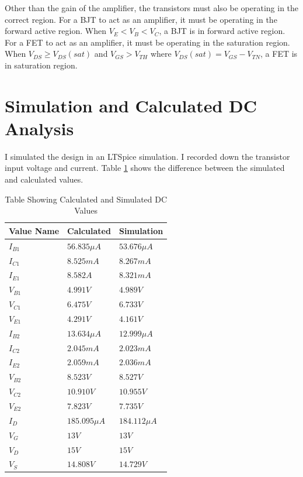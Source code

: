 \documentclass{article}
\begin{document}
Other than the gain of the amplifier, the transistors must also be operating in the correct region.
For a BJT to act as an amplifier, it must be operating in the forward active region.
When $V_{E} < V_{B} < V_{C}$, a BJT is in forward active region.
For a FET to act as an amplifier, it must be operating in the saturation region.
When $V_{DS} \ge V_{DS}(sat)$ and $V_{GS} > V_{TH}$ where $V_{DS}(sat) = V_{GS} - V_{TN}$, a FET is in saturation region.



\section{Simulation and Calculated DC Analysis}
\label{sec:dc-analysis}

I simulated the design in an LTSpice simulation.
I recorded down the transistor input voltage and current.
Table \ref{tab:sim-cal-dc-values} shows the difference between the simulated and calculated values.

\begin{table}[h]
    \caption{Table Showing Calculated and Simulated DC Values}
    \label{tab:sim-cal-dc-values}
    \centering
    \begin{tabular}{ l l l}
        \hline
        Value Name & Calculated       & Simulation       \\
        \hline
        $I_{B1}$   & $56.835 \mu{A}$  & $53.676 \mu{A}$  \\
        $I_{C1}$   & $8.525 mA$       & $8.267 mA$       \\
        $I_{E1}$   & $8.582 A$        & $8.321 mA$       \\
        $V_{B1}$   & $4.991 V$        & $4.989 V$        \\
        $V_{C1}$   & $6.475 V$        & $6.733 V$        \\
        $V_{E1}$   & $4.291 V$        & $4.161 V$        \\
        \hline
        $I_{B2}$   & $13.634 \mu{A}$  & $12.999 \mu{A}$  \\
        $I_{C2}$   & $2.045 mA$       & $2.023 mA$       \\
        $I_{E2}$   & $2.059 mA$       & $2.036 mA$       \\
        $V_{B2}$   & $8.523 V$        & $8.527 V$        \\
        $V_{C2}$   & $10.910 V$       & $10.955 V$       \\
        $V_{E2}$   & $7.823 V$        & $7.735 V$        \\
        \hline
        $I_{D}$    & $185.095 \mu{A}$ & $184.112 \mu{A}$ \\
        $V_{G}$    & $13 V$           & $13 V$           \\
        $V_{D}$    & $15 V$           & $15 V$           \\
        $V_{S}$    & $14.808 V$       & $14.729 V$       \\
        \hline
    \end{tabular}
\end{table}
\end{document}
